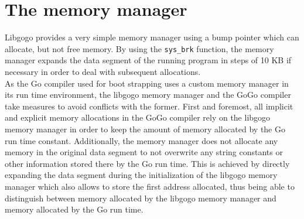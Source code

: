 \documentclass[a4paper]{scrreprt}
\begin{document}
    \section{The memory manager}
      Libgogo provides a very simple memory manager using a bump pointer which can allocate, but not free memory. By using the \texttt{sys\_brk}\cite{var97} function, the memory manager expands the data segment of the running program in steps of 10 KB if necessary in order to deal with subsequent allocations.\\
      As the Go compiler used for boot strapping uses a custom memory manager in its run time environment, the libgogo memory manager and the GoGo compiler take measures to avoid conflicts with the former. First and foremost, all implicit and explicit memory allocations in the GoGo compiler rely on the libgogo memory manager in order to keep the amount of memory allocated by the Go run time constant. Additionally, the memory manager does not allocate any memory in the original data segment to not overwrite any string constants or other information stored there by the Go run time. This is achieved by directly expanding the data segment during the initialization of the libgogo memory manager which also allows to store the first address allocated, thus being able to distinguish between memory allocated by the libgogo memory manager and memory allocated by the Go run time.
\end{document}
